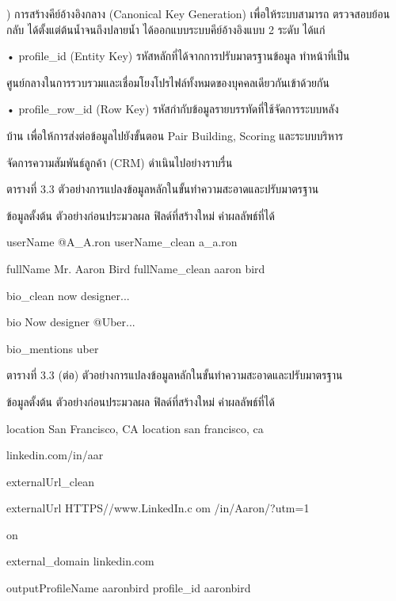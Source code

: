 \documentclass[12pt,a4paper]{report}
\begin{document}
) การสร้างคีย์อ้างอิงกลาง (Canonical Key Generation) เพื่อให้ระบบสามารถ ตรวจสอบย้อนกลับ ได้ตั้งแต่ต้นน้ำจนถึงปลายน้ำ ได้ออกแบบระบบคีย์อ้างอิงแบบ 2 ระดับ ได้แก่\par
\noindent • profile\_id (Entity Key) รหัสหลักที่ได้จากการปรับมาตรฐานข้อมูล ทำหน้าที่เป็น\par
ศูนย์กลางในการรวบรวมและเชื่อมโยงโปรไฟล์ทั้งหมดของบุคคลเดียวกันเข้าด้วยกัน\par
\noindent • profile\_row\_id (Row Key) รหัสกำกับข้อมูลรายบรรทัดที่ใช้จัดการระบบหลัง\par
บ้าน เพื่อให้การส่งต่อข้อมูลไปยังขั้นตอน Pair Building, Scoring และระบบบริหาร\par
จัดการความสัมพันธ์ลูกค้า (CRM) ดำเนินไปอย่างราบรื่น\par
\begin{center}\small ตารางที่ 3.3 ตัวอย่างการแปลงข้อมูลหลักในขั้นทำความสะอาดและปรับมาตรฐาน\end{center}
ข้อมูลตั้งต้น ตัวอย่างก่อนประมวลผล ฟิลด์ที่สร้างใหม่ ค่าผลลัพธ์ที่ได้\par
userName @A\_A.ron userName\_clean a\_a.ron\par
fullName Mr. Aaron Bird fullName\_clean aaron bird\par
bio\_clean now designer...\par
bio Now designer @Uber...\par
bio\_mentions uber\par
\clearpage
\begin{center}\small ตารางที่ 3.3 (ต่อ) ตัวอย่างการแปลงข้อมูลหลักในขั้นทำความสะอาดและปรับมาตรฐาน\end{center}
ข้อมูลตั้งต้น ตัวอย่างก่อนประมวลผล ฟิลด์ที่สร้างใหม่ ค่าผลลัพธ์ที่ได้\par
location San Francisco, CA location san francisco, ca\par
linkedin.com/in/aar\par
externalUrl\_clean\par
externalUrl HTTPS//www.LinkedIn.c om /in/Aaron/?utm=1\par
on\par
external\_domain linkedin.com\par
outputProfileName aaronbird profile\_id aaronbird\par
\end{document}
